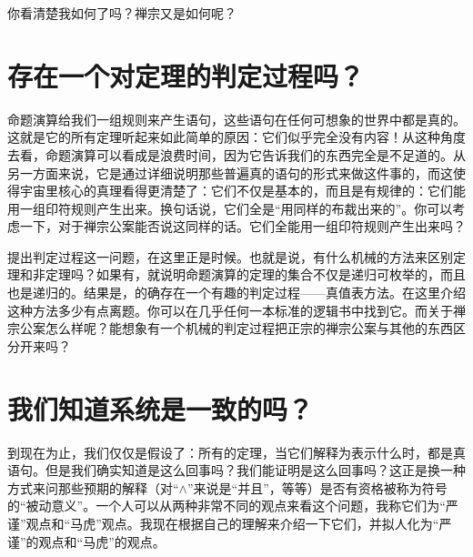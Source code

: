 你看清楚我如何了吗？禅宗又是如何呢？

\section{存在一个对定理的判定过程吗？}

命题演算给我们一组规则来产生语句，这些语句在任何可想象的世界中都是真的。这就是它的所有定理听起来如此简单的原因：它们似乎完全没有内容！从这种角度去看，命题演算可以看成是浪费时间，因为它告诉我们的东西完全是不足道的。从另一方面来说，它是通过详细说明那些普遍真的语句的形式来做这件事的，而这使得宇宙里核心的真理看得更清楚了：它们不仅是基本的，而且是有规律的：它们能用一组印符规则产生出来。换句话说，它们全是“用同样的布裁出来的”。你可以考虑一下，对于禅宗公案能否说这同样的话。它们全能用一组印符规则产生出来吗？

提出判定过程这一问题，在这里正是时候。也就是说，有什么机械的方法来区别定理和非定理吗？如果有，就说明命题演算的定理的集合不仅是递归可枚举的，而且也是递归的。结果是，的确存在一个有趣的判定过程——真值表方法。在这里介绍这种方法多少有点离题。你可以在几乎任何一本标准的逻辑书中找到它。而关于禅宗公案怎么样呢？能想象有一个机械的判定过程把正宗的禅宗公案与其他的东西区分开来吗？

\section{我们知道系统是一致的吗？}

到现在为止，我们仅仅是假设了：所有的定理，当它们解释为表示什么时，都是真语句。但是我们确实知道是这么回事吗？我们能证明是这么回事吗？这正是换一种方式来问那些预期的解释（对“$∧$”来说是“并且”，等等）是否有资格被称为符号的“被动意义”。一个人可以从两种非常不同的观点来看这个问题，我称它们为“严谨”观点和“马虎”观点。我现在根据自己的理解来介绍一下它们，并拟人化为“严谨”的观点和“马虎”的观点。

